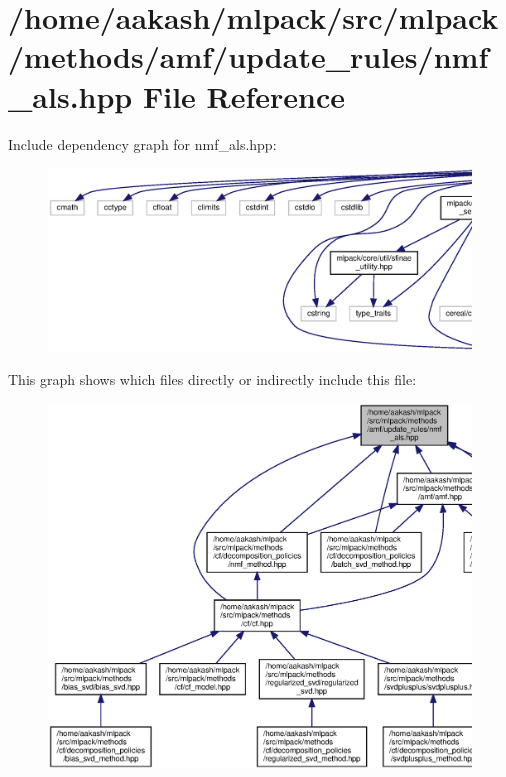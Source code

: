 \section{/home/aakash/mlpack/src/mlpack/methods/amf/update\+\_\+rules/nmf\+\_\+als.hpp File Reference}
\label{nmf__als_8hpp}
Include dependency graph for nmf\+\_\+als.\+hpp\+:
\nopagebreak
\begin{figure}[H]
\begin{center}
\leavevmode
\includegraphics[width=350pt]{nmf__als_8hpp__incl}
\end{center}
\end{figure}
This graph shows which files directly or indirectly include this file\+:
\nopagebreak
\begin{figure}[H]
\begin{center}
\leavevmode
\includegraphics[width=350pt]{nmf__als_8hpp__dep__incl}
\end{center}
\end{figure}
